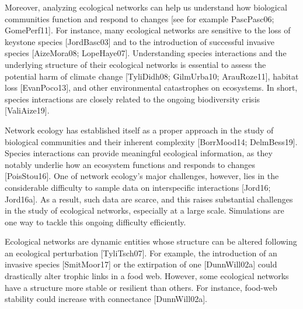 Moreover, analyzing ecological networks can help us understand how biological
communities function and respond to changes [see for example PascPasc06;
GomePerf11]. For instance, many ecological networks are sensitive to the loss
of keystone species [JordBasc03] and to the introduction of successful invasive
species [AizeMora08; LopeHaye07]. Understanding species interactions and the
underlying structure of their ecological networks is essential to assess the
potential harm of climate change [TyliDidh08; GilmUrba10; ArauRoze11],
habitat loss [EvanPoco13], and other environmental catastrophes on ecosystems.
In short, species interactions are closely related to the ongoing biodiversity
crisis [ValiAize19].  

Network
ecology has established itself as a proper approach in the study of biological
communities and their inherent complexity [BorrMood14; DelmBess19]. Species
interactions can provide meaningful ecological information, as they notably
underlie how an ecosystem functions and responds to changes [PoisStou16]. One
of network ecology's major challenges, however, lies in the considerable
difficulty to sample data on interspecific interactions [Jord16; Jord16a]. As
a result, such data are scarce, and this raises substantial challenges in the
study of ecological networks, especially at a large scale. Simulations are one
way to tackle this ongoing difficulty efficiently.

Ecological networks are dynamic entities whose
structure can be altered following an ecological perturbation [TyliTsch07]. For
example, the introduction of an invasive species [SmitMoor17] or the
extirpation of one [DunnWill02a] could drastically alter trophic links in a
food web. However, some ecological networks have a structure more stable or
resilient than others. For instance, food-web stability could increase with
connectance [DunnWill02a].

